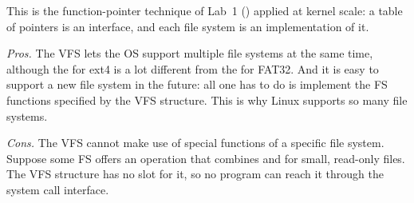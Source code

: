 This is the function-pointer technique of Lab~1 () applied at kernel scale: a table of pointers is an interface, and each file system is an implementation of it.

\emph{Pros.} The VFS lets the OS support multiple file systems at the same time, although the  for ext4 is a lot different from the  for FAT32. And it is easy to support a new file system in the future: all one has to do is implement the FS functions specified by the VFS structure. This is why Linux supports so many file systems.

\emph{Cons.} The VFS cannot make use of special functions of a specific file system. Suppose some FS offers an operation that combines  and  for small, read-only files. The VFS structure has no slot for it, so no program can reach it through the system call interface.
